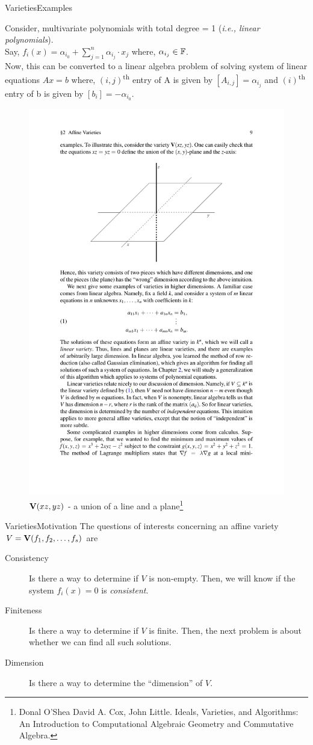\documentclass[aspectratio=169, handout, 10pt, hyperref=colorlinks]{beamer}
\begin{document}
\begin{frame}[allowframebreaks]{Varieties}{Examples}
\begin{example}
    Consider, multivariate polynomials with total degree = 1 (\emph{i.e., linear polynomials}).\\
    Say, $f_i(x) = \alpha_{i_0}+\displaystyle\sum_{j=1}^{n} \alpha_{i_j}\cdot x_j$ where, $\alpha_{i_j} \in \mathbb{F}$.\\
Now, this can be converted to a linear algebra problem of solving system of linear equations $Ax=b$ where, $(i,j)$\textsuperscript{th} entry of A is given by $[A_{i,j}] = \alpha_{i_j}$ and  $(i)$\textsuperscript{th} entry of b is given by $[b_{i}]=-\alpha_{i_0}$.
\end{example}
\begin{example}
\begin{figure}[!hbt]
    \centering
    \includegraphics[width=0.4\linewidth]{variety_dim.pdf}
    \caption{$\textbf{V}(xz,yz)$ - a union of a line and a plane\footnote{\tiny Donal O’Shea David A. Cox, John Little.
Ideals, Varieties, and Algorithms: An Introduction to Computational Algebraic Geometry and
Commutative Algebra.}}
    \label{fig:variety_dim}
\end{figure}
\end{example}
\end{frame}
\begin{frame}{Varieties}{Motivation}
    The questions of interests concerning an affine variety $V=\textbf{V}(f_1,f_2,\ldots,f_{s})$ are
\begin{description}
    \item[Consistency] Is there a way to determine if $V$ is non-empty. Then, we will know if the system $f_i(x)=0$ is \emph{consistent}.
    \item[Finiteness] Is there a way to determine if $V$ is finite. Then, the next problem is about whether we can find all such solutions.
    \item[Dimension] Is there a way to determine the ``dimension'' of $V$.
\end{description}
\end{frame}
\end{document}
